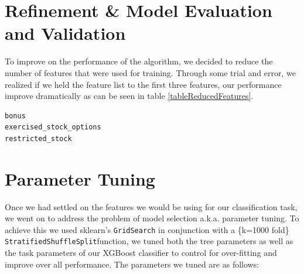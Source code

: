 \documentclass[twoside,openright,titlepage,numbers=noenddot,headinclude,%
               footinclude=true,cleardoublepage=empty,abstractoff,BCOR=5mm,%
               paper=a4,fontsize=11pt,ngerman,american]{scrreprt}
\numberwithin{theorem}{chapter}
\numberwithin{definition}{chapter}
\numberwithin{algorithm}{chapter}
\numberwithin{figure}{chapter}
\numberwithin{table}{chapter}
\numberwithin{equation}{chapter}
\begin{document}
\section*{Refinement \& Model Evaluation and Validation}
To improve on the performance of the algorithm, we decided to reduce the number of features that were used for training. Through some trial and error, we realized if we held the feature list to the first three features, our performance improve dramatically as can be seen in table \ref{tableReducedFeatures}.
\begin{verbatim}
bonus
exercised_stock_options
restricted_stock 
\end{verbatim}

\section*{Parameter Tuning}


Once we had settled on the features we would be using for our classification task, we went on to address the problem of model selection a.k.a. parameter tuning. To achieve this we used sklearn's \texttt{GridSearch} in conjunction with a \{k=1000 fold\} \texttt{StratifiedShuffleSplit}function, we tuned both the tree parameters as well as the task parameters of our XGBoost classifier to control for over-fitting and improve over all performance. The parameters we tuned are as follows:
\end{document}
